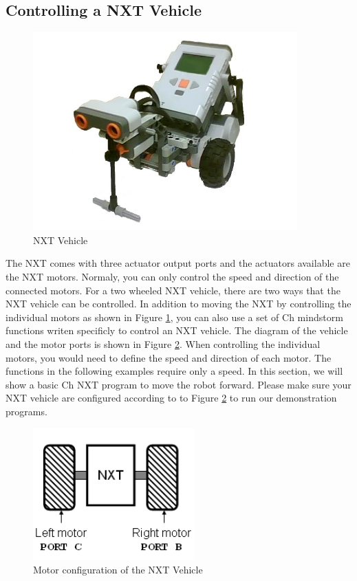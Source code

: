 \documentclass[12pt]{article}
\begin{document}
\subsection{Controlling a NXT Vehicle}
\begin{figure}[h!]
  \begin{center}
    \includegraphics[height=3in]{figure/mindstorm/NXT_vehicle.png}
    \caption{NXT Vehicle\label{fig_NXT_vehicle}}
  \end{center}
\end{figure}
\noindent
The NXT comes with three actuator output ports and the actuators available are the NXT motors. 
Normaly, you can only control the speed and direction of the connected motors. For a two wheeled NXT vehicle, 
there are two ways that the NXT vehicle can be controlled.  In addition to moving the NXT by controlling the 
individual motors as shown in Figure \ref{fig_NXT_vehicle}, you can also use a set of Ch mindstorm functions
writen specificly to control an NXT vehicle. The diagram of the vehicle and the motor ports 
is shown in Figure \ref{fig_NXT_vehport}. When controlling the individual motors, you would need to define
the speed and direction of each motor.  The functions in the following examples require only a speed. 
In this section, we will show a basic Ch NXT program to move the robot forward. Please make sure your NXT 
vehicle are configured according to to Figure \ref{fig_NXT_vehport} to run our demonstration programs.
\newline
\\
\begin{figure}[h]
  \begin{center}
    \includegraphics[height=2in]{figure/mindstorm/Vehicle.png}
    \caption{Motor configuration of the NXT Vehicle \label{fig_NXT_vehport}}
  \end{center}
\end{figure}
\end{document}
